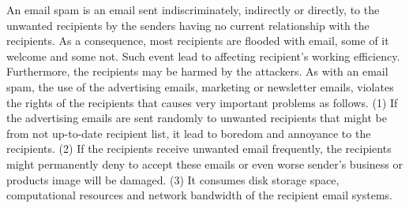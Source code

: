 \documentclass[conference]{IEEEtran}
\begin{document}
An email spam is an email sent indiscriminately, indirectly or directly, to the unwanted recipients by the senders having no current relationship with the recipients.
As a consequence, most recipients are flooded with email, some of it welcome and some not. 
Such event lead to affecting recipient's working efficiency.
Furthermore, the recipients may be harmed by the attackers.
As with an email spam, the use of the advertising emails, marketing or newsletter emails, violates the rights of the recipients that causes very important problems as follows. 
(1) If the advertising emails are sent randomly to unwanted recipients that might be from not up-to-date recipient list, it lead to boredom and annoyance to the recipients.
(2) If the recipients receive unwanted email frequently, the recipients might permanently deny to
accept these emails or even worse sender's business or products image will be damaged.
(3) It consumes disk storage space, computational resources and network bandwidth of the recipient email systems.
\end{document}
